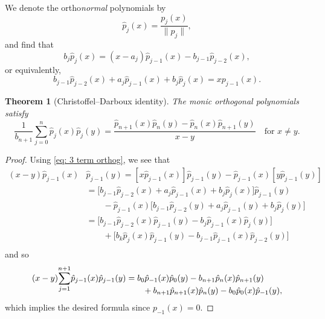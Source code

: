 \documentclass[12pt,a4paper]{article}
\newtheorem{theorem}{Theorem}
\begin{document}
We denote the ortho\emph{normal} polynomials by
\[
\hat p_j(x)=\frac{p_j(x)}{\|p_j\|},
\]
and find that
\begin{equation}\label{eq: p hat recurrence}
b_j\hat p_j(x)=(x-a_j)\hat p_{j-1}(x)-b_{j-1}\hat p_{j-2}(x),
\end{equation}
or equivalently,
\begin{equation}\label{eq: 3 term orthog}
b_{j-1}\hat p_{j-2}(x)+a_j\hat p_{j-1}(x)+b_j\hat p_j(x)=xp_{j-1}(x).
\end{equation}

\begin{theorem}[Christoffel--Darboux identity]
\label{thm: Christoffel-Darboux}
The monic orthogonal polynomials satisfy
\[
\frac{1}{b_{n+1}}\sum_{j=0}^n\hat p_j(x)\hat p_j(y)
	=\frac{\hat p_{n+1}(x)\hat p_n(y)-\hat p_n(x)\hat p_{n+1}(y)}{x-y}
	\quad\text{for $x\ne y$.}
\]
\end{theorem}
\begin{proof}
Using \eqref{eq: 3 term orthog}, we see that
\begin{align*}
(x-y)\hat p_{j-1}(x)&\hat p_{j-1}(y)
	=[x\hat p_{j-1}(x)]\hat p_{j-1}(y)
		-\hat p_{j-1}(x)[y\hat p_{j-1}(y)]\\
	&=\bigl[
	b_{j-1}\hat p_{j-2}(x)+a_j\hat p_{j-1}(x)+b_j\hat p_j(x)
	\bigr]\hat p_{j-1}(y)\\
	&\qquad{}-\hat p_{j-1}(x)\bigl[
	b_{j-1}\hat p_{j-2}(y)+a_j\hat p_{j-1}(y)+b_j\hat p_j(y)\bigr]\\
	&=\bigl[b_{j-1}\hat p_{j-2}(x)\hat p_{j-1}(y)
		-b_j\hat p_{j-1}(x)\hat p_j(y)\bigr]\\
	&\qquad{}+\bigl[b_k\hat p_j(x)\hat p_{j-1}(y)
		-b_{j-1}\hat p_{j-1}(x)\hat p_{j-2}(y)\bigr]\\
\end{align*}
and so
\begin{align*}
(x-y)\smash[b]{\sum_{j=1}^{n+1}}\hat p_{j-1}(x)\hat p_{j-1}(y)
	&=b_0\hat p_{-1}(x)\hat p_0(y)-b_{n+1}\hat p_n(x)\hat p_{n+1}(y)\\
	&\qquad{}+b_{n+1}\hat p_{n+1}(x)\hat p_n(y)
		-b_0\hat p_0(x)\hat p_{-1}(y),
\end{align*}
which implies the desired formula since $p_{-1}(x)=0$.
\end{proof}
\end{document}
